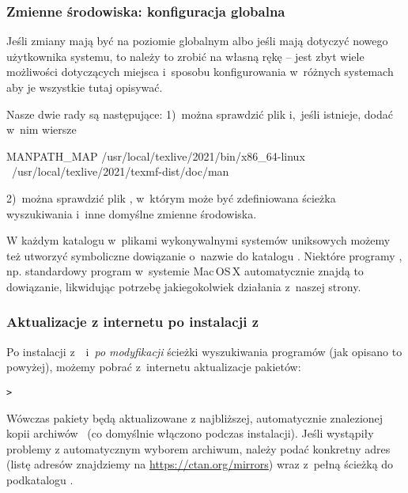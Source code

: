 \documentclass{article}
\begin{document}
\subsubsection{Zmienne środowiska: konfiguracja globalna}
\label{sec:envglobal}

Jeśli zmiany mają być na poziomie globalnym albo jeśli mają dotyczyć
nowego użytkownika systemu, to należy to zrobić na własną rękę --
jest zbyt wiele możliwości dotyczących miejsca i~sposobu
konfigurowania w~różnych systemach aby je wszystkie tutaj opisywać.

Nasze dwie rady są następujące: 1)~można sprawdzić plik
 i,~jeśli istnieje, dodać w~nim wiersze
\begin{sverbatim}
MANPATH_MAP /usr/local/texlive/2021/bin/x86_64-linux \
            /usr/local/texlive/2021/texmf-dist/doc/man
\end{sverbatim}
 2)~można sprawdzić plik , w~którym może być
zdefiniowana ścieżka wyszukiwania i~inne domyślne zmienne środowiska.

W każdym katalogu w~plikami wykonywalnymi systemów uniksowych możemy też utworzyć
symboliczne dowiązanie o~nazwie  do katalogu
. Niektóre programy , np. standardowy
program \code{man} w~systemie Mac\,OS\,X  automatycznie znajdą to dowiązanie,
likwidując potrzebę jakiegokolwiek działania z~naszej strony.

\subsubsection{Aktualizacje z internetu po instalacji z \DVD}
\label{sec:dvd-install-net-updates}

Po instalacji \TL{} z~\DVD\ i~\textit{po modyfikacji} ścieżki wyszukiwania
programów (jak opisano to powyżej), możemy pobrać z~internetu aktualizacje
pakietów:

\begin{alltt}
> 
\end{alltt}

Wówczas pakiety będą aktualizowane z najbliższej, automatycznie
znalezionej kopii archiwów \CTAN\ (co domyślnie włączono podczas instalacji).
Jeśli wystąpiły problemy z automatycznym wyborem archiwum, należy podać
konkretny adres (listę adresów znajdziemy na \url{https://ctan.org/mirrors})
wraz z~pełną ścieżką do podkatalogu \dirname{tlnet}.
\end{document}
